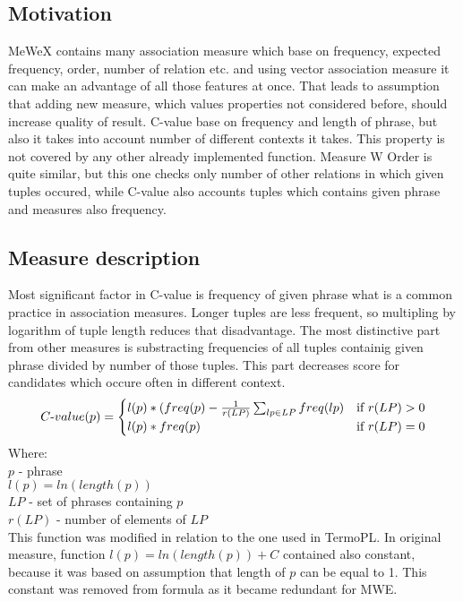 \subsection{Motivation}
MeWeX contains many association measure which base on frequency, expected frequency, order, number of relation etc. 
and using vector association measure it can make an advantage of all those features at once. That leads to assumption that adding new measure, 
which values properties not considered before, should increase quality of result. C-value base on frequency and length of phrase, 
but also it takes into account number of different contexts it takes. This property is not covered by any other already implemented function.
Measure W Order is quite similar, but this one checks only number of other relations in which given tuples occured, 
while C-value also accounts tuples which contains given phrase and measures also frequency.

\subsection{Measure description}
Most significant factor in C-value is frequency of given phrase what is a common practice in association measures. 
Longer tuples are less frequent, so multipling by logarithm of tuple length reduces that disadvantage. 
The most distinctive part from other measures is substracting frequencies of all tuples containig given phrase divided by number of those tuples. 
This part decreases score for candidates which occure often in different context.
\[ 
    C{\text -}value(p) = \begin{cases}
        l(p) * (freq(p) - \frac{1}{r(LP)}\sum_{lp \in LP}{freq(lp)} & \text{if } r(LP) > 0\\
        l(p) * freq(p)            & \text{if } r(LP) = 0\\
    \end{cases}
\]
Where: \\
\(p\)  - phrase \\
\(l(p) = ln(length(p))\) \\
\(LP\)  - set of phrases containing \(p\) \\
\(r(LP)\) - number of elements of \(LP\) \\

This function was modified in relation to the one used in TermoPL. In original measure, function \(l(p) = ln(length(p)) + C\) 
contained also constant, because it was based on assumption that length of \(p\) can be equal to 1. This constant was removed 
from formula as it became redundant for MWE.

